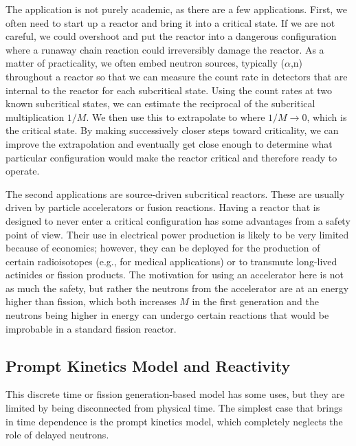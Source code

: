 The application is not purely academic, as there are a few applications. First, we often need to start up a reactor and bring it into a critical state. If we are not careful, we could overshoot and put the reactor into a dangerous configuration where a runaway chain reaction could irreversibly damage the reactor. As a matter of practicality, we often embed neutron sources, typically ($\alpha$,n) throughout a reactor so that we can measure the count rate in detectors that are internal to the reactor for each subcritical state. Using the count rates at two known subcritical states, we can estimate the reciprocal of the subcritical multiplication $1/M$. We then use this to extrapolate to where $1/M \rightarrow 0$, which is the critical state. By making successively closer steps toward criticality, we can improve the extrapolation and eventually get close enough to determine what particular configuration would make the reactor critical and therefore ready to operate.

The second applications are source-driven subcritical reactors. These are usually driven by particle accelerators or fusion reactions. Having a reactor that is designed to never enter a critical configuration has some advantages from a safety point of view. Their use in electrical power production is likely to be very limited because of economics; however, they can be deployed for the production of certain radioisotopes (e.g., for medical applications) or to transmute long-lived actinides or fission products. The motivation for using an accelerator here is not as much the safety, but rather the neutrons from the accelerator are at an energy higher than fission, which both increases $M$ in the first generation and the neutrons being higher in energy can undergo certain reactions that would be improbable in a standard fission reactor.

\subsection{Prompt Kinetics Model and Reactivity}

This discrete time or fission generation-based model has some uses, but they are limited by being disconnected from physical time. The simplest case that brings in time dependence is the prompt kinetics model, which completely neglects the role of delayed neutrons. 

